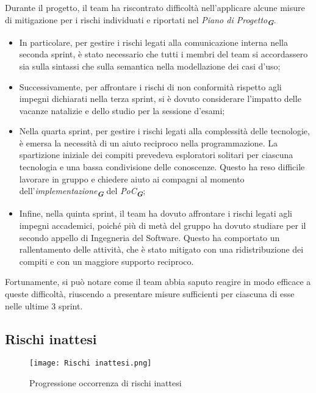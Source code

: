 Durante il progetto, il team ha riscontrato difficoltà nell'applicare alcune misure di mitigazione
per i rischi individuati e riportati nel \emph{Piano di Progetto}\textsubscript{\textbf{\textit{G}}}.
\begin{itemize}
    \item In particolare, per gestire i rischi legati alla comunicazione interna nella seconda sprint, è stato necessario che 
    tutti i membri del team si accordassero sia sulla sintassi che sulla semantica nella modellazione dei casi d'uso;
    \item Successivamente, per affrontare i rischi di non conformità rispetto agli impegni dichiarati nella terza sprint, si è 
    dovuto considerare l'impatto delle vacanze natalizie e dello studio per la sessione d'esami;
    \item Nella quarta sprint, per gestire i rischi legati alla complessità delle tecnologie, è emersa la necessità di 
    un aiuto reciproco nella programmazione. La spartizione iniziale dei compiti prevedeva esploratori solitari per ciascuna 
    tecnologia e una bassa condivisione delle conoscenze. Questo ha reso difficile lavorare in gruppo e chiedere aiuto ai compagni 
    al momento dell'\emph{implementazione}\textsubscript{\textbf{\textit{G}}} del \emph{PoC}\textsubscript{\textbf{\textit{G}}};
    \item Infine, nella quinta sprint, il team ha dovuto affrontare i rischi legati agli impegni accademici, poiché più di metà del gruppo ha dovuto studiare per il secondo appello di Ingegneria del Software. Questo ha comportato un rallentamento delle attività, che è stato mitigato con una ridistribuzione dei compiti e con un maggiore supporto reciproco.
\end{itemize}
Fortunamente, si può notare come il team abbia saputo reagire in modo efficace a queste difficoltà, riuscendo a presentare misure sufficienti per ciascuna di esse nelle ultime 3 sprint.

\newpage

\subsection{Rischi inattesi}
\label{subsec:Rischi inattesi}

\begin{figure}[h] 
    \centering
    \texttt{[image: Rischi inattesi.png]}
    \caption{Progressione occorrenza di rischi inattesi} 
    \label{fig: Rischi inattesi}
\end{figure}

